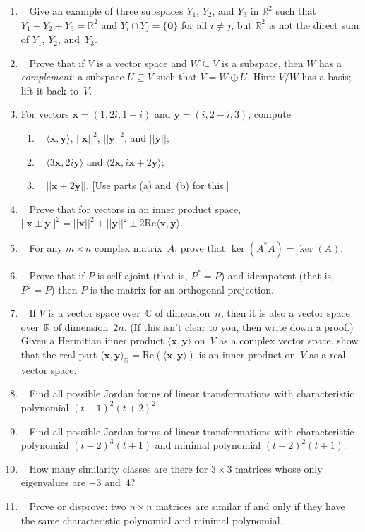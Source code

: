 \documentclass[11pt]{article}
\newcommand\score[1]{\marginpar{\vspace{-2ex}\color{blue}{#1/3}}\hspace{-1ex}}
\newcommand\0{\mathbf{0}}
\newcommand\CC{\mathbb{C}}
\newcommand\RR{\mathbb{R}}
\newcommand\xx{\mathbf{x}}
\newcommand\yy{\mathbf{y}}
\newcommand\<{\langle}
\renewcommand\>{\rangle}
\begin{document}
\begin{enumerate}
\item\ \score{}%
Give an example of three subspaces $Y_1$, $Y_2$, and $Y_3$ in $\RR^2$
such that $Y_1 + Y_2 + Y_3 = \RR^2$ and $Y_i \cap Y_j = \{\0\}$ for
all $i \neq j$, but $\RR^2$ is not the direct sum of $Y_1$, $Y_2$,
and~$Y_3$.

\item\ \score{}%
Prove that if $V$ is a vector space and $W \subseteq V$ is a subspace,
then $W$ has a \emph{complement}: a subspace $U \subseteq V$ such that
$V = W \oplus U$.  Hint: $V/W$ has a basis; lift it back to~$V$.

\item%
For vectors $\xx = (1, 2i, 1+i)$ and $\yy = (i, 2-i, 3)$, compute
\begin{enumerate}[itemsep=-1ex]
\item\ \score{}%
$\<\xx,\yy\>$, $||\xx||^2$, $||\yy||^2$, and $||\yy||$;
\item\ \score{}%
$\<3\xx,2i\yy\>$ and $\<2\xx,i\xx + 2\yy\>$;
\item\ \score{}%
$||\xx+2\yy||$.  [Use parts (a) and~(b) for this.]
\end{enumerate}

\item\ \score{}%
Prove that for vectors in an inner product space,
$||\xx\pm\yy||^2 = ||\xx||^2 + ||\yy||^2 \pm 2\mathrm{Re}\<\xx,\yy\>$.

\item\ \score{}%
For any $m \times n$ complex matrix~$A$, prove that $\ker(A^* A) =
\ker(A)$.

\item\ \score{}%
Prove that if $P$ is self-ajoint (that is, $P^* = P$) and idempotent
(that is, $P^2 = P$) then $P$ is the matrix for an orthogonal
projection.

\item\ \score{}%
If $V$ is a vector space over~$\CC$ of dimension~$n$, then it is also
a vector space over~$\RR$ of dimension~$2n$.  (If this isn't clear to
you, then write down a proof.)  Given a Hermitian inner product
$\<\xx,\yy\>$ on~$V$ as a complex vector space, show that the real
part $\<\xx,\yy\>_\RR = \mathrm{Re}(\<\xx,\yy\>)$ is an inner product
on~$V$ as a real vector space.

\item\ \score{}%
Find all possible Jordan forms of linear transformations with
characteristic polynomial $(t - 1)^2 (t + 2)^2$.

\item\ \score{}%
Find all possible Jordan forms of linear transformations with
characteristic polynomial $(t - 2)^3 (t + 1)$ and minimal polynomial
$(t - 2)^2 (t + 1)$.

\item\ \score{}%
How many similarity classes are there for $3 \times 3$ matrices whose
only eigenvalues are $-3$ and~$4$?

\item\ \score{}%
Prove or disprove: two $n \times n$ matrices are similar if and only
if they have the same characteristic polynomial and minimal
polynomial.
\end{enumerate}


\end{document}
